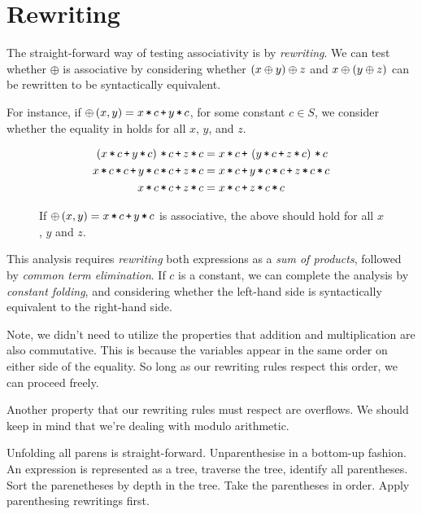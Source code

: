 
\section{Rewriting}

The straight-forward way of testing associativity is by \emph{rewriting}. We
can test whether $\oplus$ is associative by considering whether $\left({x \oplus y}\right)
\oplus z$ and $x \oplus \left({y \oplus z}\right)$ can be rewritten to be syntactically
equivalent.

For instance, if $\oplus\p{x,y} = x\lt c \lp y \lt c$, for some constant $c\in
S$, we consider whether the equality in  holds
for all $x$, $y$, and $z$.

\begin{figure*}[htbp!]
\begin{align*}
\p{x\lt c \lp y\lt c}\lt c \lp z\lt c &= x\lt c \lp \p{y\lt c \lp z\lt c}\lt c \\
x\lt c \lt c \lp y\lt c \lt c \lp z\lt c &= x\lt c \lp y\lt c \lt c \lp z\lt c \lt c \\
x\lt c \lt c \lp z\lt c &= x\lt c \lp z\lt c \lt c
\end{align*}
\caption[]{If $\oplus\p{x,y}=x\lt c \lp y\lt c$ is associative, the above
should hold for all $x$, $y$ and $z$.}
\label{figure:first-equality}
\end{figure*}

This analysis requires \emph{rewriting} both expressions as a \emph{sum of
products}, followed by \emph{common term elimination}. If $c$ is a constant, we
can complete the analysis by \emph{constant folding}, and considering whether
the left-hand side is syntactically equivalent to the right-hand side.

Note, we didn't need to utilize the properties that addition and multiplication
are also commutative.  This is because the variables appear in the same order
on either side of the equality. So long as our rewriting rules respect this
order, we can proceed freely. 

Another property that our rewriting rules must respect are overflows. We should
keep in mind that we're dealing with modulo arithmetic.

Unfolding all parens is straight-forward. Unparenthesise in a bottom-up
fashion. An expression is represented as a tree, traverse the tree, identify
all parentheses. Sort the parenetheses by depth in the tree. Take the
parentheses in order. Apply parenthesing rewritings first.


